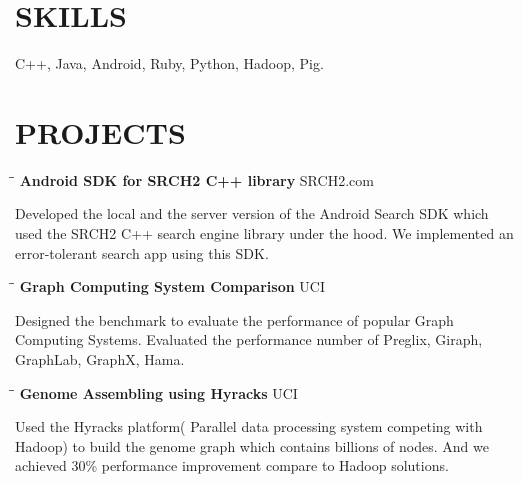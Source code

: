\documentclass{res}
\begin{document}
\begin{resume}
\section{SKILLS}          
    C++, Java, Android, Ruby, Python, Hadoop, Pig.
 
\section{PROJECTS}
   \vspace{-0.1in}	
   \begin{tabbing}
   \hspace{2in}\= \hspace{3in}\= \kill %
    {\bf Android SDK for SRCH2 C++ library }\>  \>SRCH2.com\\
   \end{tabbing}\vspace{-30pt}      %
   Developed the local and the server version of the Android Search SDK which used the SRCH2 C++ search engine library under the hood. We implemented an error-tolerant search app using this SDK. 
   \vspace{-0.1in}	
   \begin{tabbing}
   \hspace{2in}\= \hspace{3in}\= \kill %
    {\bf Graph Computing System Comparison }\> \>UCI     \\
   \end{tabbing}\vspace{-30pt}      %
   Designed the benchmark to evaluate the performance of popular Graph Computing Systems. Evaluated the performance number of Preglix, Giraph, GraphLab, GraphX, Hama. 
%
   \vspace{-0.1in}	
   \begin{tabbing}
   \hspace{2in}\= \hspace{3in}\= \kill %
    {\bf Genome Assembling using Hyracks }\> \>UCI     \\
   \end{tabbing}\vspace{-30pt}      %
   Used the Hyracks platform( Parallel data processing system competing with Hadoop) to build the genome graph which contains billions of nodes. And we achieved 30\% performance improvement compare to Hadoop solutions.
%
   \vspace{-0.1in}	

\end{resume}
\end{document}
